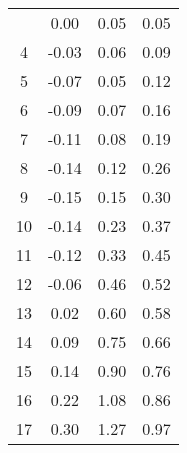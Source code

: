 \begin{longtable}[c]{cccc}
	\endlastfoot
	3                        & 0.00                                 & 0.05                                 & 0.05                       \\
	4                        & -0.03                                & 0.06                                 & 0.09                       \\
	5                        & -0.07                                & 0.05                                 & 0.12                       \\
	6                        & -0.09                                & 0.07                                 & 0.16                       \\
	7                        & -0.11                                & 0.08                                 & 0.19                       \\
	8                        & -0.14                                & 0.12                                 & 0.26                       \\
	9                        & -0.15                                & 0.15                                 & 0.30                       \\
	10                       & -0.14                                & 0.23                                 & 0.37                       \\
	11                       & -0.12                                & 0.33                                 & 0.45                       \\
	12                       & -0.06                                & 0.46                                 & 0.52                       \\
	13                       & 0.02                                 & 0.60                                 & 0.58                       \\
	14                       & 0.09                                 & 0.75                                 & 0.66                       \\
	15                       & 0.14                                 & 0.90                                 & 0.76                       \\
	16                       & 0.22                                 & 1.08                                 & 0.86                       \\
	17                       & 0.30                                 & 1.27                                 & 0.97                       \\

\end{longtable}
